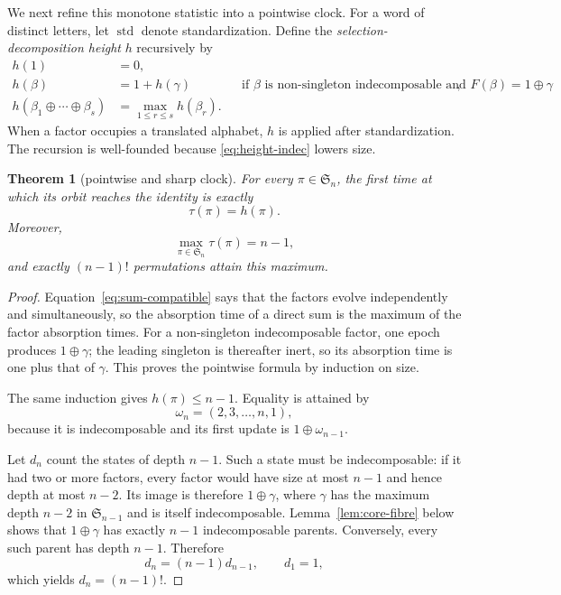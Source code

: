 \documentclass[a4paper,10pt]{amsart}
\newtheorem{theorem}{Theorem}[section]
\theoremstyle{definition}
\theoremstyle{remark}
\newcommand{\Sn}{\mathfrak S_n}
\newcommand{\std}{\operatorname{std}}
\begin{document}
We next refine this monotone statistic into a pointwise clock.  For a word of
distinct letters, let $\std$ denote standardization.  Define the
\emph{selection-decomposition height} $h$ recursively by
\begin{align}
 h(1)&=0,\label{eq:height-singleton}\\
 h(\beta)&=1+h(\gamma)
 &&\text{if $\beta$ is non-singleton indecomposable and
          $F(\beta)=1\oplus\gamma$},\label{eq:height-indec}\\
 h(\beta_1\oplus\cdots\oplus\beta_s)
   &=\max_{1\le r\le s}h(\beta_r).
 \label{eq:height-sum}
\end{align}
When a factor occupies a translated alphabet, $h$ is applied after
standardization.  The recursion is well-founded because
\eqref{eq:height-indec} lowers size.

\begin{theorem}[pointwise and sharp clock]\label{thm:clock}
For every $\pi\in\Sn$, the first time at which its orbit reaches the identity
is exactly
\[
                            \tau(\pi)=h(\pi).
\]
Moreover,
\begin{equation}\label{eq:max-tail}
                  \max_{\pi\in\Sn}\tau(\pi)=n-1,
\end{equation}
and exactly $(n-1)!$ permutations attain this maximum.
\end{theorem}

\begin{proof}
Equation~\eqref{eq:sum-compatible} says that the factors evolve independently
and simultaneously, so the absorption time of a direct sum is the maximum
of the factor absorption times.  For a non-singleton indecomposable factor,
one epoch produces $1\oplus\gamma$; the leading singleton is thereafter
inert, so its absorption time is one plus that of $\gamma$.  This proves the
pointwise formula by induction on size.

The same induction gives $h(\pi)\le n-1$.  Equality is attained by
\begin{equation}\label{eq:witness}
                         \omega_n=(2,3,\ldots,n,1),
\end{equation}
because it is indecomposable and its first update is $1\oplus\omega_{n-1}$.

Let $d_n$ count the states of depth $n-1$.  Such a state must be
indecomposable: if it had two or more factors, every factor would have size
at most $n-1$ and hence depth at most $n-2$.  Its image is therefore
$1\oplus\gamma$, where $\gamma$ has the maximum depth $n-2$ in
$\mathfrak S_{n-1}$ and is itself indecomposable.  Lemma~\ref{lem:core-fibre}
below shows that $1\oplus\gamma$ has exactly $n-1$ indecomposable parents.
Conversely, every such parent has depth $n-1$.  Therefore
\[
                     d_n=(n-1)d_{n-1},\qquad d_1=1,
\]
which yields $d_n=(n-1)!$.
\end{proof}
\end{document}
